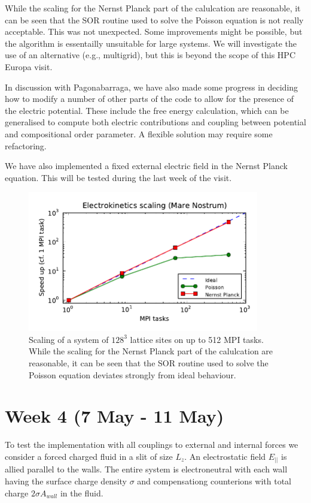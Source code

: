 \documentclass[aps,pre,preprint,groupedaddress]{revtex4-1}
\begin{document}
While the scaling for the Nernst Planck part of
the calulcation are reasonable, it can be seen that the SOR routine
used to solve the Poisson equation is not really acceptable. This
was not unexpected. Some improvements might be possible, but the
algorithm is essentailly unsuitable for large systems. We will
investigate the use of an alternative (e.g., multigrid), but this
is beyond the scope of this HPC Europa visit.

In discussion with Pagonabarraga, we have also made some progress
in deciding how to modify a number of other parts of the code to
allow for the presence of the electric potential. These include
the free energy calculation, which can be generalised to compute
both electric contributions and coupling between potential and
compositional order parameter. A flexible solution may require
some refactoring.

We have also implemented a fixed external electric field in the
Nernst Planck equation. This will be tested during the last week
of the visit.

\begin{figure}[h!t]
\includegraphics[width=0.9\textwidth]{scaling.pdf}
\caption{Scaling of a system of $128^3$ lattice sites on up to 512 MPI tasks. 
While the scaling for the Nernst Planck part of the calulcation are reasonable, 
it can be seen that the SOR routine used to solve the Poisson equation deviates
strongly from ideal behaviour.} 
\label{fig5} 
\end{figure}

\section{Week 4 (7 May - 11 May)}

To test the implementation with all couplings to external and 
internal forces we consider a forced charged fluid in a slit
of size $L_z$. An electrostatic field $E_{||}$ is allied
parallel to the walls. The entire system is electroneutral with 
each wall having the surface charge density $\sigma$ 
and compensationg counterions with total charge $2 \sigma A_{wall}$
in the fluid.
\end{document}
